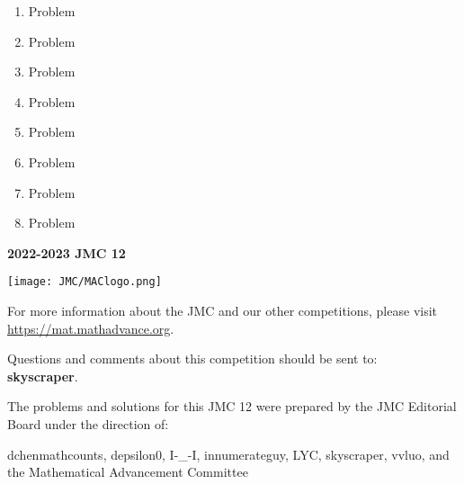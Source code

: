 \documentclass[10pt, twoside]{article}
\newcommand{\contestNumber}{12}
\newcommand{\theYear}{2022-2023}
\begin{document}
\begin{justify}
\begin{enumerate}[itemsep=3.76389mm]
\ans{}{}{}{}{}

\item Problem

\ans{}{}{}{}{}

\item Problem

\ans{}{}{}{}{}

\item Problem

\ans{}{}{}{}{}

\item Problem

\ans{}{}{}{}{}

\item Problem

\ans{}{}{}{}{}

\item Problem

\ans{}{}{}{}{}

\item Problem

\ans{}{}{}{}{}

\item Problem

\ans{}{}{}{}{}
\end{enumerate}

\newpage
\thispagestyle{empty}
\begin{center}\textbf{\huge {\theYear} JMC {\contestNumber}} \end{center}
\vspace{-6mm}
\begin{center} \noindent\hrulefill \end{center}
\vspace{-3mm}
\begin{center} \texttt{[image: JMC/MAClogo.png]}
\end{center}
\vspace{-5mm}
\begin{center}
For more information about the JMC and our other competitions, please visit \url{https://mat.mathadvance.org}.
\end{center}
\begin{center} Questions and comments about this competition should be sent to:  
\vspace{4mm}
\\ \textbf{skyscraper}.\end{center}
\begin{center}The problems and solutions for this JMC {\contestNumber} were prepared by the JMC Editorial Board under the direction of:\end{center}
\vspace{-3.5mm}
\begin{center}
dchenmathcounts, depsilon0, I-\_-I, innumerateguy, LYC, skyscraper, vvluo,
and the Mathematical Advancement Committee\end{center}
\end{justify}
\end{document}
